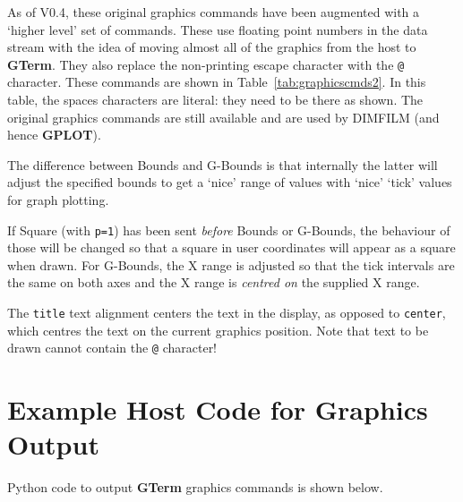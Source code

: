 \documentclass[a4paper,twoside,11pt]{article}
\newcommand{\newpara}{\par\vspace{4mm}\noindent}
\begin{document}
\newpara
As of V0.4, these original graphics commands have been augmented with a `higher level' set of
commands. These use floating point numbers in the data stream with the idea of moving almost all
of the graphics from the host to \textbf{GTerm}.  They also replace the non-printing escape
character with the \texttt{@} character. These commands are shown in Table~\ref{tab:graphicscmds2}.
In this table, the spaces characters are literal: they need to be there as shown. The original graphics 
commands are still available and are used by DIMFILM (and hence \textbf{GPLOT}).

\newpara
The difference between Bounds and G-Bounds  is that internally the latter will adjust the specified bounds
to get  a `nice' range of values with `nice' `tick' values for graph plotting.

\newpara
If Square (with \texttt{p=1}) has been sent \emph{before} Bounds or G-Bounds, the behaviour of those
will be changed so that a square in user coordinates will appear as a square when drawn. For G-Bounds, 
the X range is adjusted so that the tick intervals are the same on both
axes and the X range is \emph{centred on} the supplied X range.

\newpara
The \texttt{title} text alignment centers the text in the display, as opposed to \texttt{center}, which centres
the text on the current graphics position. Note that text to be drawn cannot contain the \texttt{@} character!

\section{Example Host Code for Graphics Output}
Python code to output \textbf{GTerm} graphics commands is shown below.
\end{document}
